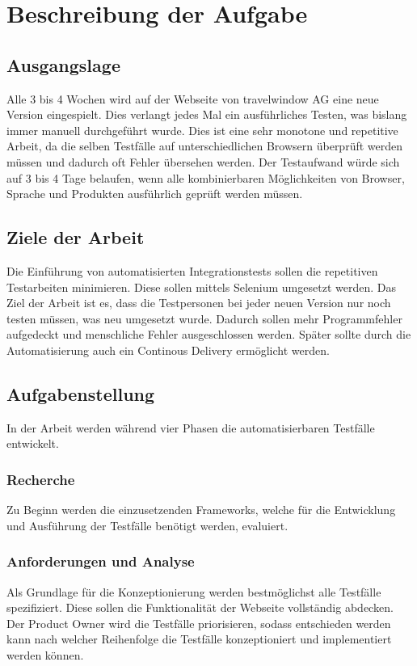 \chapter{Beschreibung der Aufgabe}

\section{Ausgangslage}
Alle 3 bis 4 Wochen wird auf der Webseite von travelwindow AG eine neue Version eingespielt. Dies verlangt jedes Mal ein ausführliches Testen, was bislang immer manuell durchgeführt wurde. Dies ist eine sehr monotone und repetitive Arbeit, da die selben Testfälle auf unterschiedlichen Browsern überprüft werden müssen und dadurch oft Fehler übersehen werden. Der Testaufwand würde sich auf 3 bis 4 Tage belaufen, wenn alle kombinierbaren Möglichkeiten von Browser, Sprache und Produkten ausführlich geprüft werden müssen.

\section{Ziele der Arbeit}
\label{sec:desc:targets}
Die Einführung von automatisierten Integrationstests sollen die repetitiven Testarbeiten minimieren. Diese sollen mittels Selenium umgesetzt werden.
Das Ziel der Arbeit ist es, dass die Testpersonen bei jeder neuen Version nur noch testen müssen, was neu umgesetzt wurde.  Dadurch sollen mehr Programmfehler aufgedeckt und menschliche Fehler ausgeschlossen werden.
Später sollte durch die Automatisierung auch ein Continous Delivery ermöglicht werden.

\section{Aufgabenstellung}
In der Arbeit werden während vier Phasen die automatisierbaren Testfälle entwickelt. 

\subsection{Recherche}
Zu Beginn werden die einzusetzenden Frameworks, welche für die Entwicklung und Ausführung der Testfälle benötigt werden, evaluiert.

\subsection{Anforderungen und Analyse}
Als Grundlage für die Konzeptionierung werden bestmöglichst alle Testfälle spezifiziert. Diese sollen die Funktionalität der Webseite vollständig abdecken. Der Product Owner wird die Testfälle priorisieren, sodass entschieden werden kann nach welcher Reihenfolge die Testfälle konzeptioniert und implementiert werden können.

